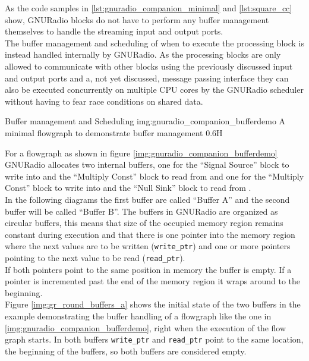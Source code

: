 As the code samples in \autoref{lst:gnuradio_companion_minimal}
and \autoref{lst:square_cc} show, GNURadio blocks do not have to
perform any buffer management themselves to handle the streaming
input and output ports. \\

The buffer management and scheduling of when to execute the processing
block is instead handled internally by GNURadio.
As the processing blocks are only allowed to communicate with
other blocks using the previously discussed input and output ports
and a, not yet discussed, message passing interface they can also
be executed concurrently on multiple CPU cores by the GNURadio scheduler
without having to fear race conditions on shared data. \\

\begin{subchapter}{Buffer management and Scheduling}
                  {img:gnuradio_companion_bufferdemo}
                  {A minimal flowgraph to demonstrate buffer management}
                  {0.6}{H}

  For a flowgraph as shown in figure \ref{img:gnuradio_companion_bufferdemo}
  GNURadio  allocates two internal buffers, one for the ``Signal Source'' block
  to write into and the ``Multiply Const'' block to read from and one for the
  ``Multiply Const'' block to write into and the ``Null Sink'' block to
  read from \cite{grblogbuffers}. \\

  In the following diagrams the first buffer are called ``Buffer A''
  and the second buffer will be called ``Buffer B''.
  The buffers in GNURadio are organized as circular buffers, this means
  that size of the occupied memory region remains constant during execution
  and that there is one pointer into the memory region where the next
  values are to be written (\texttt{write\_ptr}) and one or more
  pointers pointing to the next value to be read (\texttt{read\_ptr}). \\

  If both pointers point to the same position in memory the buffer is empty.
  If a pointer is incremented past the end of the memory region
  it wraps around to the beginning. \\

  Figure \ref{img:gr_round_buffers_a} shows the initial state of the
  two buffers in the example demonstrating the buffer handling
  of a flowgraph like the one in \autoref{img:gnuradio_companion_bufferdemo},
  right when the execution of the flow graph starts.
  In both buffers \texttt{write\_ptr} and \texttt{read\_ptr}
  point to the same location, the beginning of the buffers,
  so both buffers are considered empty.


\end{subchapter}
